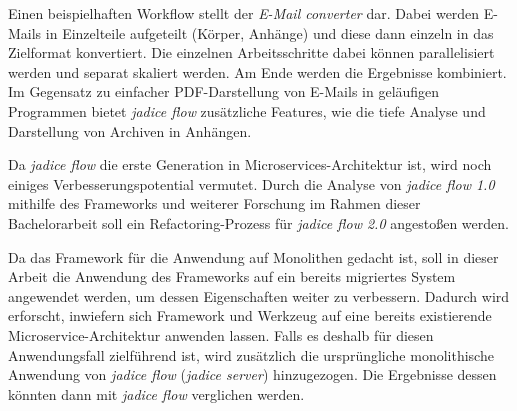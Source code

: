 Einen beispielhaften Workflow stellt der \emph{E-Mail converter} dar.
Dabei werden E-Mails in Einzelteile aufgeteilt (Körper, Anhänge) und diese dann einzeln in das Zielformat konvertiert.
Die einzelnen Arbeitsschritte dabei können parallelisiert werden und separat skaliert werden.
Am Ende werden die Ergebnisse kombiniert.
Im Gegensatz zu einfacher PDF-Darstellung von E-Mails in geläufigen Programmen bietet \emph{jadice flow} zusätzliche Features, wie die tiefe Analyse und Darstellung von Archiven in Anhängen.

Da \emph{jadice flow} die erste Generation in Microservices-Architektur ist, wird noch einiges Verbesserungspotential vermutet.
Durch die Analyse von \emph{jadice flow 1.0} mithilfe des Frameworks und weiterer Forschung im Rahmen dieser Bachelorarbeit soll ein Refactoring-Prozess für \emph{jadice flow 2.0} angestoßen werden.

Da das Framework für die Anwendung auf Monolithen gedacht ist, soll in dieser Arbeit die Anwendung des Frameworks auf ein bereits migriertes System angewendet werden, um dessen Eigenschaften weiter zu verbessern.
Dadurch wird erforscht, inwiefern sich Framework und Werkzeug auf eine bereits existierende Microservice-Architektur anwenden lassen.
Falls es deshalb für diesen Anwendungsfall zielführend ist, wird zusätzlich die ursprüngliche monolithische Anwendung von \emph{jadice flow} (\emph{jadice server}) hinzugezogen.
Die Ergebnisse dessen könnten dann mit \emph{jadice flow} verglichen werden.
